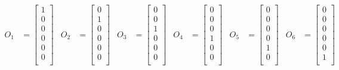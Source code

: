 \documentclass{mitschrift}
\begin{document}
\begin{align}
    O_1 &= \begin{bmatrix}
        1 \\
        0 \\
        0 \\
        0 \\
        0 \\
        0 \\
    \end{bmatrix} & O_2 &= \begin{bmatrix}
        0 \\
        1 \\
        0 \\
        0 \\
        0 \\
        0 \\
    \end{bmatrix} & O_3 &= \begin{bmatrix}
        0 \\
        0 \\
        1 \\
        0 \\
        0 \\
        0 \\
    \end{bmatrix} & O_4 &= \begin{bmatrix}
        0 \\
        0 \\
        0 \\
        1 \\
        0 \\
        0 \\
    \end{bmatrix} & O_5 &= \begin{bmatrix}
        0 \\
        0 \\
        0 \\
        0 \\
        1 \\
        0 \\
    \end{bmatrix} & O_6 &= \begin{bmatrix}
        0 \\
        0 \\
        0 \\
        0 \\
        0 \\
        1 \\

\end{bmatrix}
\end{align}
\end{document}
